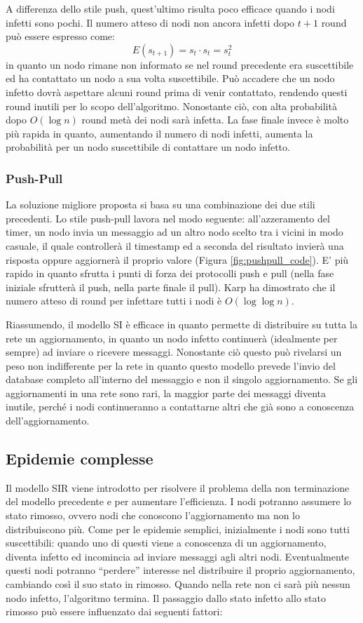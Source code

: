 A differenza dello stile push, quest'ultimo risulta poco efficace quando i nodi infetti sono pochi. Il numero atteso di nodi non ancora infetti dopo $t+1$ round può essere espresso come:
\begin{equation}
    E(s_{t+1}) = s_t \cdot s_t = s_t^2
\end{equation}
in quanto un nodo rimane non informato se nel round precedente era suscettibile ed ha contattato un nodo a sua volta suscettibile. Può accadere che un nodo infetto dovrà aspettare alcuni round prima di venir contattato, rendendo questi round inutili per lo scopo dell'algoritmo. Nonostante ciò, con alta probabilità dopo $O(\log n)$ round metà dei nodi sarà infetta. La fase finale invece è molto più rapida in quanto, aumentando il numero di nodi infetti, aumenta la probabilità per un nodo suscettibile di contattare un nodo infetto.
\subsubsection{Push-Pull}
La soluzione migliore proposta si basa su una combinazione dei due stili precedenti. Lo stile push-pull lavora nel modo seguente: all’azzeramento del timer, un nodo invia un messaggio ad un altro nodo scelto tra i vicini in modo casuale, il quale controllerà il timestamp ed a seconda del risultato invierà una risposta oppure aggiornerà il proprio valore (Figura \ref{fig:pushpull_code}). E’ più rapido in quanto sfrutta i punti di forza dei protocolli push e pull (nella fase iniziale sfrutterà il push, nella parte finale il pull). Karp \cite{karp} ha dimostrato che il numero atteso di round per infettare tutti i nodi è $O(\log\log n)$.

Riassumendo, il modello SI è efficace in quanto permette di distribuire su tutta la rete un aggiornamento, in quanto un nodo infetto continuerà (idealmente per sempre) ad inviare o ricevere messaggi. Nonostante ciò questo può rivelarsi un peso non indifferente per la rete in quanto questo modello prevede l’invio del database completo all’interno del messaggio e non il singolo aggiornamento. Se gli aggiornamenti in una rete sono rari, la maggior parte dei messaggi diventa inutile, perché i nodi continueranno a contattarne altri che già sono a conoscenza  dell’aggiornamento. 
\subsection{Epidemie complesse}

Il modello SIR viene introdotto per risolvere il problema della non terminazione del modello precedente e per aumentare l’efficienza. I nodi potranno assumere lo stato rimosso, ovvero nodi che conoscono l’aggiornamento ma non lo distribuiscono più.
Come per le epidemie semplici, inizialmente i nodi sono tutti suscettibili: quando uno di questi viene a conoscenza di un aggiornamento, diventa infetto ed incomincia ad inviare messaggi agli altri nodi. Eventualmente questi nodi potranno “perdere” interesse nel distribuire il proprio aggiornamento, cambiando così il suo stato in rimosso.
Quando nella rete non ci sarà più nessun nodo infetto, l’algoritmo termina.
Il passaggio dallo stato infetto allo stato rimosso può essere influenzato dai seguenti fattori:

